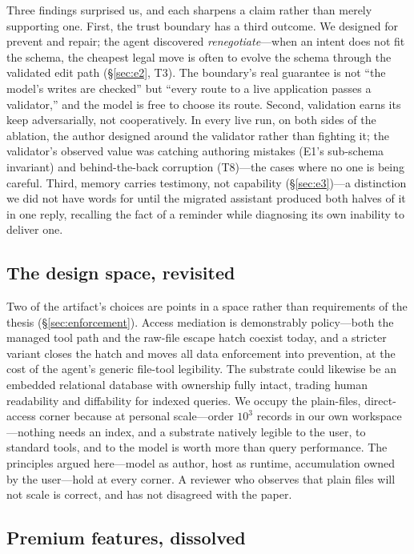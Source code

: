 \documentclass[11pt]{article}
\begin{document}
Three findings surprised us, and each sharpens a claim rather than merely
supporting one. First, the trust boundary has a third outcome. We designed for
prevent and repair; the agent discovered \emph{renegotiate}---when an intent does
not fit the schema, the cheapest legal move is often to evolve the schema through
the validated edit path (\S\ref{sec:e2}, T3). The boundary's real guarantee is
not ``the model's writes are checked'' but ``every route to a live application
passes a validator,'' and the model is free to choose its route. Second,
validation earns its keep adversarially, not cooperatively. In every live run, on
both sides of the ablation, the author designed around the validator rather than
fighting it; the validator's observed value was catching authoring mistakes
(E1's sub-schema invariant) and behind-the-back corruption (T8)---the cases where
no one is being careful. Third, memory carries testimony, not capability
(\S\ref{sec:e3})---a distinction we did not have words for until the migrated
assistant produced both halves of it in one reply, recalling the fact of a
reminder while diagnosing its own inability to deliver one.

\subsection{The design space, revisited}
\label{sec:design-space}

Two of the artifact's choices are points in a space rather than requirements of
the thesis (\S\ref{sec:enforcement}). Access mediation is demonstrably
policy---both the managed tool path and the raw-file escape hatch coexist today,
and a stricter variant closes the hatch and moves all data enforcement into
prevention, at the cost of the agent's generic file-tool legibility. The
substrate could likewise be an embedded relational database with ownership fully
intact, trading human readability and diffability for indexed queries. We occupy
the plain-files, direct-access corner because at personal scale---order $10^3$
records in our own workspace---nothing needs an index, and a substrate natively
legible to the user, to standard tools, and to the model is worth more than query
performance. The principles argued here---model as author, host as runtime,
accumulation owned by the user---hold at every corner. A reviewer who observes
that plain files will not scale is correct, and has not disagreed with the paper.

\subsection{Premium features, dissolved}
\label{sec:premium}
\end{document}
